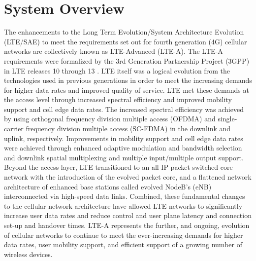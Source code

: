 \section{System Overview}
\label{sys-overview}
The enhancements to the Long Term Evolution/System Architecture Evolution (LTE/SAE) to meet the requirements set out for fourth generation (4G) cellular networks are collectively known as LTE-Advanced (LTE-A).  The LTE-A requirements were formalized by the 3rd Generation Partnership Project (3GPP) in LTE releases 10 through 13 \cite{tr36913}.  LTE itself was a logical evolution from the technologies used in previous generations in order to meet the increasing demands for higher data rates and improved quality of service. LTE met these demands at the access level through increased spectral efficiency and improved mobility support and cell edge data rates.  The increased spectral efficiency was achieved by using orthogonal frequency division multiple access (OFDMA) and single-carrier frequency division multiple access (SC-FDMA) in the downlink and uplink, respectively.  Improvements in mobility support and cell edge data rates were achieved through enhanced adaptive modulation and bandwidth selection and downlink spatial multiplexing and multiple input/multiple output support.  Beyond the access layer, LTE transitioned to an all-IP packet switched core network with the introduction of the evolved packet core, and a flattened network architecture of enhanced base stations called evolved NodeB's (eNB) interconnected via high-speed data links.  Combined, these fundamental changes to the cellular network architecture have allowed LTE networks to significantly increase user data rates and reduce control and user plane latency and connection set-up and handover times.  LTE-A represents the further, and ongoing, evolution of cellular networks to continue to meet the ever-increasing demands for higher data rates, user mobility support, and efficient support of a growing number of wireless devices.

